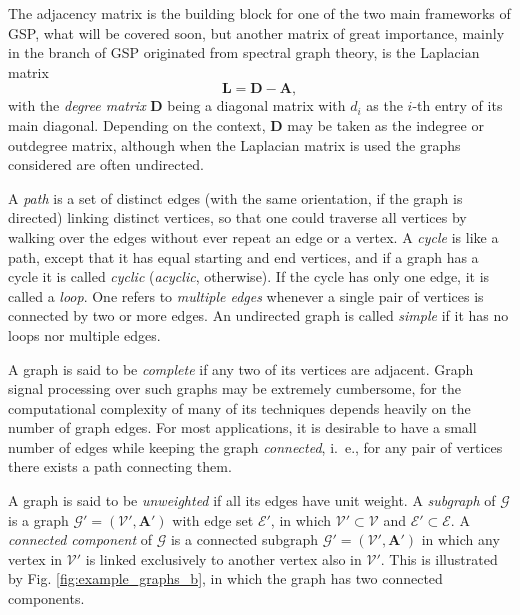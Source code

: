 The adjacency matrix is the building block for one of the two main frameworks of GSP, what will be covered soon, but another matrix of great importance, mainly in the branch of GSP originated from spectral graph theory, is the Laplacian matrix
\begin{equation}
\mathbf{L} = \mathbf{D} - \mathbf{A},
\end{equation}
with the \emph{degree matrix} $ \mathbf{D} $ being a diagonal matrix with $ d_i $ as the $ i $-th entry of its main diagonal. Depending on the context, $ \mathbf{D} $ may be taken as the indegree or outdegree matrix, although when the Laplacian matrix is used the graphs considered are often undirected.

A \emph{path} is a set of distinct edges (with the same orientation, if the graph is directed) linking distinct vertices, so that one could traverse all vertices by walking over the edges without ever repeat an edge or a vertex. A \emph{cycle} is like a path, except that it has equal starting and end vertices, and if a graph has a cycle it is called \emph{cyclic} (\emph{acyclic}, otherwise). If the cycle has only one edge, it is called a \emph{loop}. One refers to \emph{multiple edges} whenever a single pair of vertices is connected by two or more edges. An undirected graph is called \emph{simple} if it has no loops nor multiple edges.

A graph is said to be \emph{complete} if any two of its vertices are adjacent. Graph signal processing over such graphs may be extremely cumbersome, for the computational complexity of many of its techniques depends heavily on the number of graph edges. For most applications, it is desirable to have a small number of edges while keeping the graph \emph{connected}, i.~e., for any pair of vertices there exists a path connecting them.

A graph is said to be \emph{unweighted} if all its edges have unit weight. A \emph{subgraph} of $ \mathcal{G} $ is a graph $ \mathcal{G}' = (\mathcal{V}', \mathbf{A}')$ with edge set $ \mathcal{E}' $, in which $ \mathcal{V}' \subset \mathcal{V} $ and $ \mathcal{E}' \subset \mathcal{E} $. A \emph{connected component} of $ \mathcal{G} $ is a connected subgraph $ \mathcal{G}' = (\mathcal{V}', \mathbf{A}')$ in which any vertex in $ \mathcal{V}' $ is linked exclusively to another vertex also in $ \mathcal{V}' $. This is illustrated by Fig. \ref{fig:example_graphs_b}, in which the graph has two connected components.

